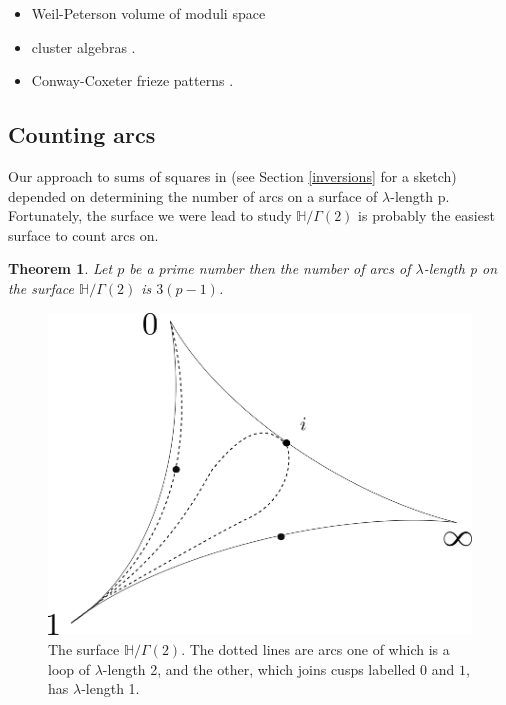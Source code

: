 \documentclass[12pt,a4paper]{amsart}
\newtheorem{thm}{Theorem}[section]
\def\HH{\mathbb{H}}
\def\g2{\Gamma(2)}
\def\xx{\HH/\g2}
\begin{document}
\begin{itemize}
	\item Weil-Peterson volume of moduli space \cite{bob}
	\item cluster algebras \cite{fomin}.
	\item Conway-Coxeter frieze patterns \cite{frieze}.
\end{itemize}

\subsection{Counting arcs}
Our approach to sums of squares in \cite{vlad} (see Section \ref{inversions} for a sketch) depended on determining the number of arcs on a surface
of $\lambda$-length p.
Fortunately, the surface we were lead to study $\xx$ is  probably
the easiest surface to count arcs on.

\begin{thm}\label{g2 arcs}
	Let $p$ be a prime number then the number of arcs of
	$\lambda$-length p on the surface
	$\xx$ is $3(p-1)$.
\end{thm}



 \begin{figure}[ht]
\begin{center}
\includegraphics[scale=.3]{3sphere.png} 
\end{center}
\caption{The surface $\xx$. The dotted lines are arcs one of which
is a loop of $\lambda$-length 2, 
and the other,
which joins cusps labelled $0$ and $1$, has $\lambda$-length 1.}
\label{3sphere}
\end{figure}
\end{document}
